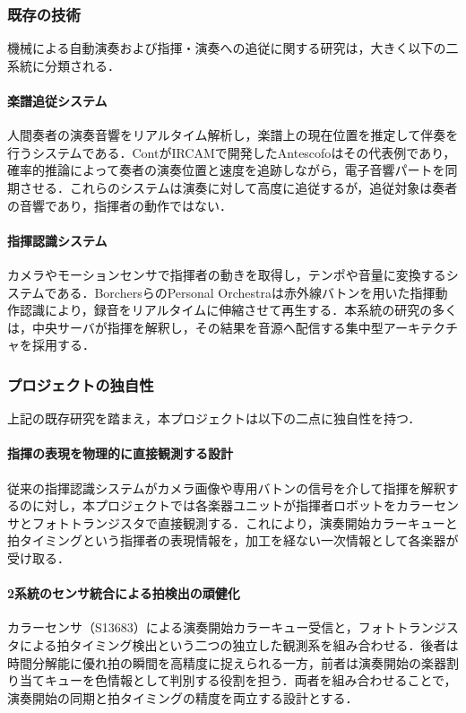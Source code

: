 \subsubsection{既存の技術}

機械による自動演奏および指揮・演奏への追従に関する研究は，大きく以下の二系統に分類される．

\paragraph{楽譜追従システム}
人間奏者の演奏音響をリアルタイム解析し，楽譜上の現在位置を推定して伴奏を行うシステムである．ContがIRCAMで開発したAntescofo\cite{cont2008antescofo}はその代表例であり，確率的推論によって奏者の演奏位置と速度を追跡しながら，電子音響パートを同期させる．これらのシステムは演奏に対して高度に追従するが，追従対象は奏者の音響であり，指揮者の動作ではない．

\paragraph{指揮認識システム}
カメラやモーションセンサで指揮者の動きを取得し，テンポや音量に変換するシステムである．BorchersらのPersonal Orchestra\cite{borchers2004personal}は赤外線バトンを用いた指揮動作認識により，録音をリアルタイムに伸縮させて再生する．本系統の研究の多くは，中央サーバが指揮を解釈し，その結果を音源へ配信する集中型アーキテクチャを採用する．

\subsubsection{プロジェクトの独自性}

上記の既存研究を踏まえ，本プロジェクトは以下の二点に独自性を持つ．

\paragraph{指揮の表現を物理的に直接観測する設計}
従来の指揮認識システムがカメラ画像や専用バトンの信号を介して指揮を解釈するのに対し，本プロジェクトでは各楽器ユニットが指揮者ロボットをカラーセンサとフォトトランジスタで直接観測する．これにより，演奏開始カラーキューと拍タイミングという指揮者の表現情報を，加工を経ない一次情報として各楽器が受け取る．

\paragraph{2系統のセンサ統合による拍検出の頑健化}
カラーセンサ（S13683）による演奏開始カラーキュー受信と，フォトトランジスタによる拍タイミング検出という二つの独立した観測系を組み合わせる．後者は時間分解能に優れ拍の瞬間を高精度に捉えられる一方，前者は演奏開始の楽器割り当てキューを色情報として判別する役割を担う．両者を組み合わせることで，演奏開始の同期と拍タイミングの精度を両立する設計とする．

